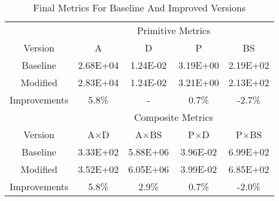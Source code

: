 \begin{table}[H]
\centering
\begin{tabular}{ccccc}

&
\multicolumn{4}{c}{Primitive Metrics}\\
Version &
\ttfamily A &
\ttfamily D &
\ttfamily P &
\ttfamily BS \\
Baseline &
\num{2.68E+04} &
\num{1.24E-02} &
\num{3.19E+00} &
\num{2.19E+02} \\
Modified &
\num{2.83E+04} &
\num{1.24E-02} &
\num{3.21E+00} &
\num{2.13E+02} \\
Improvements &
\color{green} 5.8\% &
- &
\color{green} 0.7\% &
\color{red} -2.7\% \\

\midrule

& \multicolumn{4}{c}{Composite Metrics}\\
Version &
\ttfamily A$\times$D &
\ttfamily A$\times$BS &
\ttfamily P$\times$D &
\ttfamily P$\times$BS\\
Baseline &
\num{3.33E+02} &
\num{5.88E+06} &
\num{3.96E-02} &
\num{6.99E+02} \\
Modified &
\num{3.52E+02} &
\num{6.05E+06} &
\num{3.99E-02} &
\num{6.85E+02} \\
Improvements &
\color{green} 5.8\% &
\color{green} 2.9\% &
\color{green} 0.7\% &
\color{red} -2.0\%\\
\end{tabular}
\caption{Final Metrics For Baseline And Improved Versions}
\label{tbl:final_metrics}
\end{table}